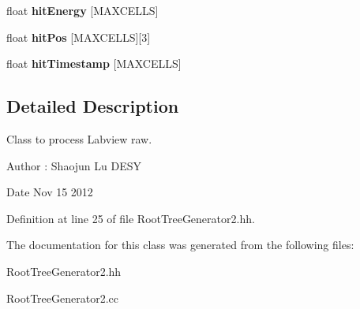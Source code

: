 \begin{DoxyCompactItemize}
\item 
float {\bfseries hit\-Energy} [M\-A\-X\-C\-E\-L\-L\-S]\label{classCALICE_1_1RootTreeGenerator2_af193968dbbbced70a48cb8c91542b63b}

\item 
float {\bfseries hit\-Pos} [M\-A\-X\-C\-E\-L\-L\-S][3]\label{classCALICE_1_1RootTreeGenerator2_a4643eefe73766b7c5f7a07fcd774dd3e}

\item 
float {\bfseries hit\-Timestamp} [M\-A\-X\-C\-E\-L\-L\-S]\label{classCALICE_1_1RootTreeGenerator2_a3b0120528cb9709ead78bf63759d843c}

\end{DoxyCompactItemize}


\subsection{Detailed Description}
Class to process Labview raw. 

\begin{DoxyAuthor}{Author}
\-: Shaojun Lu D\-E\-S\-Y 
\end{DoxyAuthor}
\begin{DoxyDate}{Date}
Nov 15 2012 
\end{DoxyDate}


Definition at line 25 of file Root\-Tree\-Generator2.\-hh.



The documentation for this class was generated from the following files\-:\begin{DoxyCompactItemize}
\item 
Root\-Tree\-Generator2.\-hh\item 
Root\-Tree\-Generator2.\-cc\end{DoxyCompactItemize}
